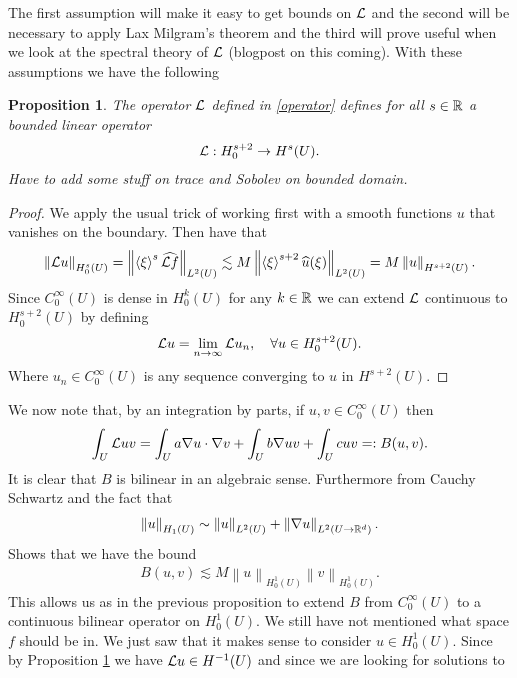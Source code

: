 \documentclass[12pt]{article}
\newtheorem{proposition}{Proposition}
\newcommand{\red}[1]{{\color{red}#1}}
\newcommand{\br}[1]{\left\langle#1\right\rangle} \newcommand{\set}[1]{\left\{#1\right\}} \newcommand{\qp}[1]{\left(#1\right)}\newcommand{\qb}[1]{\left[#1\right]}
\renewcommand{\norm}[1]{\left\lVert #1 \right\rVert}\renewcommand{\abs}[1]{\left| #1 \right|}
\begin{document}
The first assumption will make it easy to get bounds on $\mathcal{L}$ and the second will be necessary to apply Lax Milgram's theorem and the third will prove useful when we look at the spectral theory of $\mathcal{L}$ (blogpost on this coming). With these assumptions we have the following
\begin{proposition}\label{domain L}
  The operator $\mathcal{L}$ defined in \eqref{operator} defines for all $s \in \mathbb{R}$ a bounded linear operator
  \begin{align*}
    \mathcal{L} : H_0^{s+2}\to H^s (U).
  \end{align*}
  \red{Have to add some stuff on trace and Sobolev on bounded domain.}
\end{proposition}
\begin{proof}
  We apply the usual trick of working first with a smooth functions $u$ that vanishes on the boundary. Then have that
  \begin{align*}
    \norm{\Ll u}_{H^s_0(U)}=\norm{\br{\xi }^s \wh{\Ll f}}_{L^2(U)}\lesssim  M \norm{\br{\xi }^{s+2}\wh{u}(\xi )}_{L^2(U)} =M \norm{u}_{H^{s+2}(U)} .
  \end{align*}
  Since $C_0^\infty(U)$ is dense in $H^k_0(U)$ for any $k \in \mathbb{R}$ we can extend $\mathcal{L}$ continuous to $H_0^{s+2}(U)$ by defining
  \begin{align*}
    \mathcal{L} u = \lim_{n \to \infty}\mathcal{L} u_n , \quad\forall u \in  H_0^{s+2}(U).
  \end{align*}
  Where $u_n \in C_0^\infty(U)$ is any sequence converging to $u$ in  $H^{s+2}(U)$.
\end{proof}
We now note that, by an integration by parts, if $u,v \in  C_0^\infty(U)$ then \begin{align*}
  \int_{U} \mathcal{L} u v =\int_{U}a \nabla u \cdot \nabla v + \int_{U} b \nabla  u v + \int_{U} cuv=: B(u,v)   .
\end{align*}
It is clear that $B$ is bilinear in an algebraic sense. Furthermore from Cauchy Schwartz and  the fact that
\begin{align*}
  \norm{u}_{H_1(U)}\sim \norm{u}_{L^2(U)}+\norm{\nabla u}_{L^2(U\to \R^d)}.
\end{align*}
Shows that we have the bound
\begin{align}\label{cont B}
  B(u,v)\lesssim M \norm{u}_{H_0^1(U)}\norm{v}_{H_0^1(U)}.
\end{align}
This allows us as in the previous proposition to extend $B$ from $C_0^\infty(U)$ to a continuous bilinear operator on  $H^1_0(U)$. We still have not mentioned what space $f$ should be in. We just saw that it makes sense to consider $u \in  H_0^1(U)$. Since by Proposition \ref{domain L} we have $\mathcal{L} u \in H^{-1}(U)$ and since we are looking for solutions to
\end{document}
